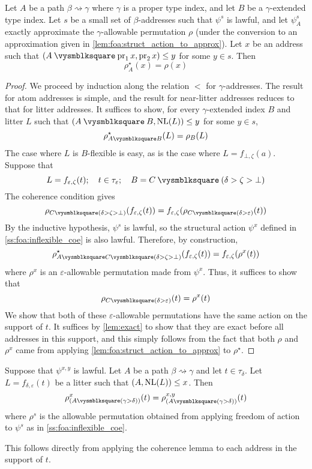 \begin{lemma}
    \label{lem:coherence}
    Let \( A \) be a path \( \beta \rightsquigarrow \gamma \) where \( \gamma \) is a proper type index, and let \( B \) be a \( \gamma \)-extended type index.
    Let \( s \) be a small set of \( \beta \)-addresses such that \( \psi^s \) is lawful, and let \( \psi^s_A \) exactly approximate the \( \gamma \)-allowable permutation \( \rho \) (under the conversion to an approximation given in \cref{lem:foa:struct_action_to_approx}).
    Let \( x \) be an address such that \( (A \pcomp \pr_1 x, \pr_2 x) \leq y \) for some \( y \in s \).
    Then
    \[ \rho^\star_A(x) = \rho(x) \]
\end{lemma}
\begin{proof}
    We proceed by induction along the relation \( < \) for \( \gamma \)-addresses.
    The result for atom addresses is simple, and the result for near-litter addresses reduces to that for litter addresses.
    It suffices to show, for every \( \gamma \)-extended index \( B \) and litter \( L \) such that \( (A \pcomp B, \NL(L)) \leq y \) for some \( y \in s \),
    \[ \rho^\star_{A \pcomp B}(L) = \rho_B(L) \]
    The case where \( L \) is \( B \)-flexible is easy, as is the case where \( L = f_{\bot,\zeta}(a) \).
    Suppose that
    \[ L = f_{\varepsilon,\zeta}(t);\quad t \in \tau_\varepsilon;\quad B = C \pcomp (\delta > \zeta > \bot) \]
    The coherence condition gives
    \[ \rho_{C \pcomp (\delta > \zeta > \bot)}(f_{\varepsilon,\zeta}(t)) = f_{\varepsilon,\zeta}(\rho_{C \pcomp (\delta > \varepsilon)}(t)) \]
    By the inductive hypothesis, \( \psi^s \) is lawful, so the structural action \( \psi^x \) defined in \cref{ss:foa:inflexible_coe} is also lawful.
    Therefore, by construction,
    \[ \rho^\star_{A \pcomp C \pcomp (\delta > \zeta > \bot)}(f_{\varepsilon,\zeta}(t)) = f_{\varepsilon,\zeta}(\rho^x(t)) \]
    where \( \rho^x \) is an \( \varepsilon \)-allowable permutation made from \( \psi^x \).
    Thus, it suffices to show that
    \[ \rho_{C \pcomp (\delta > \varepsilon)}(t) = \rho^x(t) \]
    We show that both of these \( \varepsilon \)-allowable permutations have the same action on the support of \( t \).
    It suffices by \cref{lem:exact} to show that they are exact before all addresses in this support, and this simply follows from the fact that both \( \rho \) and \( \rho^x \) came from applying \cref{lem:foa:struct_action_to_approx} to \( \rho^\star \).
\end{proof}

\begin{corollary}
    \label{cor:foa_both}
    Suppose that \( \psi^{x,y} \) is lawful.
    Let \( A \) be a path \( \beta \rightsquigarrow \gamma \) and let \( t \in \tau_\delta \).
    Let \( L = f_{\delta,\varepsilon}(t) \) be a litter such that \( (A, \operatorname{NL}(L)) \leq x \).
    Then
    \[ \rho^x_{(A \pcomp (\gamma > \delta))}(t) = \rho^{x,y}_{(A \pcomp (\gamma > \delta))}(t) \]
    where \( \rho^s \) is the allowable permutation obtained from applying freedom of action to \( \psi^s \) as in \cref{ss:foa:inflexible_coe}.
\end{corollary}
This follows directly from applying the coherence lemma to each address in the support of \( t \).

